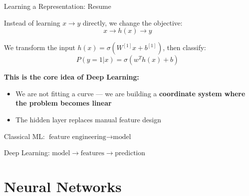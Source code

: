 \documentclass[aspectratio=169]{beamer}
\begin{document}
\begin{frame}{Learning a Representation: Resume}

Instead of learning $x \rightarrow y$ directly, we change the objective:
\[
x \rightarrow h(x) \rightarrow y
\]

We transform the input $h(x) = \sigma(W^{[1]}x + b^{[1]})$, then classify:
\[
P(y=1|x)=\sigma(w^T h(x)+b)
\]

\textbf{This is the core idea of Deep Learning:}
\begin{itemize}
  \item We are not fitting a curve --- we are building a \textbf{coordinate system where the problem becomes linear}
  \item The hidden layer replaces manual feature design
\end{itemize}

\medskip
Classical ML: $\text{feature engineering} \rightarrow \text{model}$

Deep Learning: $\text{model} \rightarrow \text{features} \rightarrow \text{prediction}$
\end{frame}
%
\section{Neural Networks}
%
\end{document}
